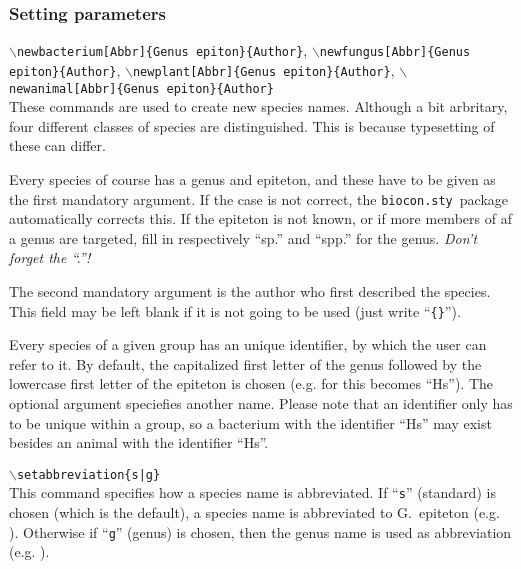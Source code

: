 \documentclass[a4paper]{article}
\newcommand{\biocon}{{\tt biocon.sty}}
\begin{document}
      \subsubsection{Setting parameters}
        \begin{description}
          \item{{\tt $\backslash$newbacterium[Abbr]\{Genus epiton\}\{Author\}}, {{\tt $\backslash$newfungus[Abbr]\{Genus epiton\}\{Author\}}}, {{\tt $\backslash$newplant[Abbr]\{Genus epiton\}\{Author\}}}, {{\tt $\backslash$newanimal[Abbr]\{Genus epiton\}\{Author\}}}}\\
	    These commands are used to create new species names. Although a bit arbritary, four different classes of species are distinguished. This is because typesetting of these can differ.
	  
	    Every species of course has a genus and epiteton, and these have to be given as the first mandatory argument. If the case is not correct, the \biocon\ package automatically corrects this. If the epiteton is not known, or if more members of af a genus are targeted, fill in respectively ``sp.'' and ``spp.'' for the genus. \emph{Don't forget the ``.''{!}}
	  
	    The second mandatory argument is the author who first described the species. This field may be left blank if it is not going to be used (just write ``{\tt\{\}}'').
          
	    Every species of a given group has an unique identifier, by which the user can refer to it. By default, the capitalized first letter of the genus followed by the lowercase first letter of the epiteton is chosen (e.g. for  this becomes ``Hs''). The optional argument speciefies another name. Please note that an identifier only has to be unique within a group, so a bacterium with the identifier ``Hs'' may exist besides an animal with the identifier ``Hs''.
	
	  \item{{\tt $\backslash$setabbreviation\{s|g\}}}\\
	    This command specifies how a species name is abbreviated. If ``{\tt s}'' (standard) is chosen (which is the default), a species name is abbreviated to G.~epiteton (e.g. ). Otherwise if ``{\tt g}'' (genus) is chosen, then the genus name is used as abbreviation (e.g. ).
        \end{description}	
\end{document}
